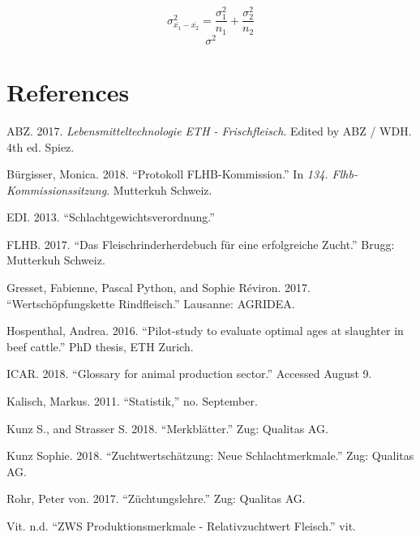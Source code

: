 \documentclass[]{article}
\begin{document}
\[\sigma_{\bar{x_{1}} - \bar{x_{2}}}^2 = \frac {\sigma_{1}^2}{n_{1}} + \frac{\sigma_{2}^2}{n_{2}}\]
\[\sigma^2\]

\section*{References}\label{references}

\hypertarget{refs}{}
\hypertarget{ref-ABZ2017}{}
ABZ. 2017. \emph{Lebensmitteltechnologie ETH - Frischfleisch}. Edited by
ABZ / WDH. 4th ed. Spiez.

\hypertarget{ref-Burgisser2018}{}
Bürgisser, Monica. 2018. ``Protokoll FLHB-Kommission.'' In \emph{134.
Flhb-Kommissionssitzung}. Mutterkuh Schweiz.

\hypertarget{ref-EDI2013}{}
EDI. 2013. ``Schlachtgewichtsverordnung.''

\hypertarget{ref-FLHB2017}{}
FLHB. 2017. ``Das Fleischrinderherdebuch für eine erfolgreiche Zucht.''
Brugg: Mutterkuh Schweiz.

\hypertarget{ref-Gresset2017}{}
Gresset, Fabienne, Pascal Python, and Sophie Réviron. 2017.
``Wertschöpfungskette Rindfleisch.'' Lausanne: AGRIDEA.

\hypertarget{ref-Hospenthal2016}{}
Hospenthal, Andrea. 2016. ``Pilot-study to evaluate optimal ages at
slaughter in beef cattle.'' PhD thesis, ETH Zurich.

\hypertarget{ref-ICAR}{}
ICAR. 2018. ``Glossary for animal production sector.'' Accessed August
9.

\hypertarget{ref-Kalisch2011}{}
Kalisch, Markus. 2011. ``Statistik,'' no. September.

\hypertarget{ref-KunzS.2018}{}
Kunz S., and Strasser S. 2018. ``Merkblätter.'' Zug: Qualitas AG.

\hypertarget{ref-Kunz2018}{}
Kunz Sophie. 2018. ``Zuchtwertschätzung: Neue Schlachtmerkmale.'' Zug:
Qualitas AG.

\hypertarget{ref-VonRohr2017}{}
Rohr, Peter von. 2017. ``Züchtungslehre.'' Zug: Qualitas AG.

\hypertarget{ref-Vit}{}
Vit. n.d. ``ZWS Produktionsmerkmale - Relativzuchtwert Fleisch.'' vit.
\end{document}
